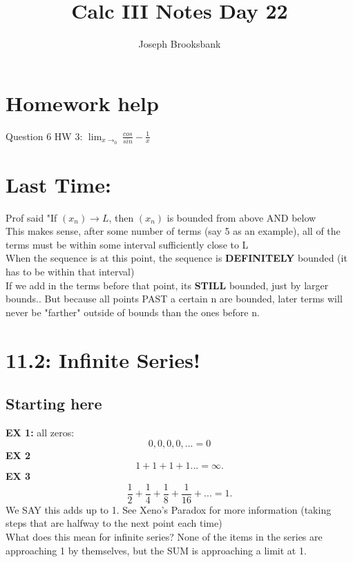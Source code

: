 \documentclass[]{article}
\title{Calc III Notes Day 22}
\author{Joseph Brooksbank}
\begin{document}
\maketitle
\section*{Homework help}
Question 6 HW 3: 
$\lim_{x\to_0}  \frac{cos}{sin} - \frac{1}{x} $

\section*{Last Time:}
Prof said "If $(x_n) \to L$, then $(x_n)$ is bounded from above AND below
\\
This makes sense, after some number of terms (say 5 as an example), all of the terms must be within some interval sufficiently close to L 
\\ 
When the sequence is at this point, the sequence is \textbf{DEFINITELY} bounded (it has to be within that interval)
\\
If we add in the terms before that point, its \textbf{STILL} bounded, just by larger bounds.. But because all points PAST a certain n are bounded, later terms will never be "farther" outside of bounds than the ones before n.
\\
\noindent{}


\section*{11.2: Infinite Series!}
\noindent{}
    \subsection*{Starting here}
    \textbf{EX 1:} all zeros:
    \[
    0, 0, 0, 0,... = 0
    \] 
    \textbf{EX 2}
    \[
    1 + 1 + 1 + 1...= \infty
    .\] 
    \textbf{EX 3}
    \[
    \frac{1}{2} + \frac{1}{4} + \frac{1}{8} + \frac{1}{16} + ... = 1
    .\] We SAY this adds up to 1. See Xeno's Paradox for more information (taking steps that are halfway to the next point each time)  
    \\ 
    What does this mean for infinite series?
    None of the items in the series are approaching 1 by themselves, but the SUM is approaching a limit at 1.
    \\
    \noindent{}
\end{document}
